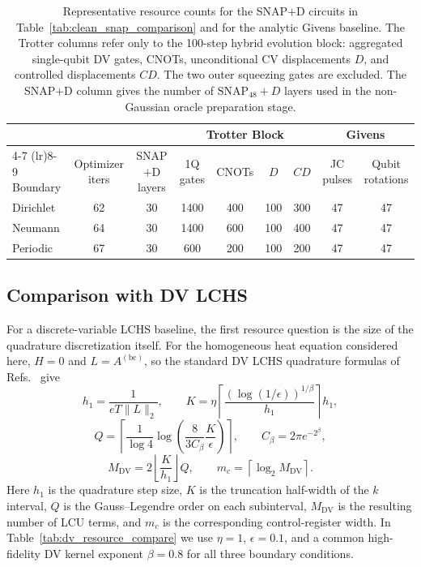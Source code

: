 \begin{table}[h]
\centering
{\small
\caption{Representative resource counts for the SNAP$+$D circuits in Table~\ref{tab:clean_snap_comparison} and for the analytic Givens baseline. The Trotter columns refer only to the 100-step hybrid evolution block: aggregated single-qubit DV gates, CNOTs, unconditional CV displacements $D$, and controlled displacements $CD$. The two outer squeezing gates are excluded. The SNAP$+$D column gives the number of $\mathrm{SNAP}_{48}+D$ layers used in the non-Gaussian oracle preparation stage.}
\label{tab:clean_resource_counts}
\begin{tabular}{lcccccccc}
\toprule
& & & \multicolumn{4}{c}{Trotter Block} & \multicolumn{2}{c}{Givens} \\
\cmidrule(lr){4-7} \cmidrule(lr){8-9}
Boundary & Optimizer iters & SNAP$+$D layers & 1Q gates & CNOTs & $D$ & $CD$ & JC pulses & Qubit rotations \\
\midrule
Dirichlet & 62 & 30 & 1400 & 400 & 100 & 300 & 47 & 47 \\
Neumann & 64 & 30 & 1400 & 600 & 100 & 400 & 47 & 47 \\
Periodic & 67 & 30 & 600 & 200 & 100 & 200 & 47 & 47 \\
\bottomrule
\end{tabular}}
\end{table}

\subsection{Comparison with DV LCHS}

For a discrete-variable LCHS baseline, the first resource question is the size of the quadrature discretization itself. For the homogeneous heat equation considered here, $H=0$ and $L=A^{(\mathrm{bc})}$, so the standard DV LCHS quadrature formulas of Refs.~\cite{LCHS1,LCHS2} give
\[
h_1=\frac{1}{eT\|L\|_2},\qquad
K=\eta\left\lceil \frac{(\log(1/\epsilon))^{1/\beta}}{h_1}\right\rceil h_1,
\]
\[
Q=
\left\lceil
\frac{1}{\log 4}
\log\!\left(
\frac{8}{3C_\beta}\frac{K}{\epsilon}
\right)
\right\rceil,
\qquad
C_\beta = 2\pi e^{-2^\beta},
\]
\[
M_{\mathrm{DV}} = 2\left\lfloor \frac{K}{h_1}\right\rfloor Q,
\qquad
m_c = \left\lceil \log_2 M_{\mathrm{DV}}\right\rceil .
\]
Here $h_1$ is the quadrature step size, $K$ is the truncation half-width of the $k$ interval, $Q$ is the Gauss--Legendre order on each subinterval, $M_{\mathrm{DV}}$ is the resulting number of LCU terms, and $m_c$ is the corresponding control-register width. In Table~\ref{tab:dv_resource_compare} we use $\eta=1$, $\epsilon=0.1$, and a common high-fidelity DV kernel exponent $\beta=0.8$ for all three boundary conditions.

